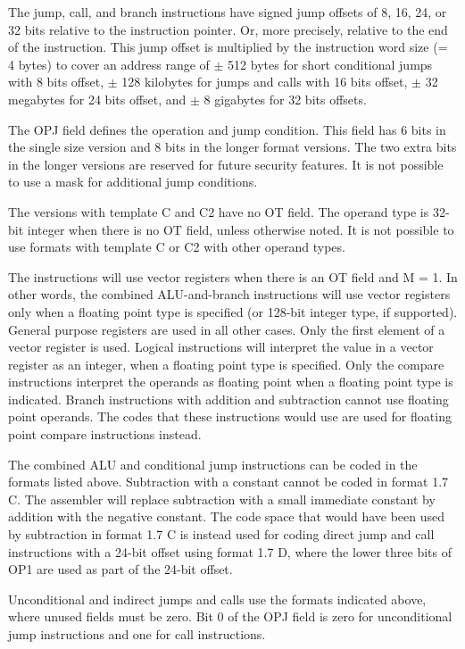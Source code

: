 \documentclass[forwardcom.tex]{subfiles}
\begin{document}
The jump, call, and branch instructions have signed jump offsets of 8, 16, 24, or 32 bits relative to the instruction pointer. Or, more precisely, relative to the end of the instruction. This jump offset is multiplied by the instruction word size (= 4 bytes) to cover an address range of $\pm$ 512 bytes for short conditional jumps with 8 bits offset, $\pm$ 128 kilobytes for jumps and calls with 16 bits offset, $\pm$ 32 megabytes for 24 bits offset, and $\pm$ 8 gigabytes for 32 bits offsets.
\vv

The OPJ field defines the operation and jump condition. This field has 6 bits in the single size version and 8 bits in the longer format versions. The two extra bits in the longer versions are reserved for future security features. It is not possible to use a mask for additional jump conditions.
\vv

The versions with template C and C2 have no OT field. The operand type is 32-bit integer when there is no OT field, unless otherwise noted. It is not possible to use formats with template C or C2 with other operand types. 
\vv

The instructions will use vector registers when there is an OT field and M = 1. In other words, the combined ALU-and-branch instructions will use vector registers only when a floating point type is specified (or 128-bit integer type, if supported). General purpose registers are used in all other cases. Only the first element of a vector register is used. 
Logical instructions will interpret the value in a vector register as an integer, when a floating point type is specified. Only the compare instructions interpret the operands as floating point when a floating point type is indicated. Branch instructions with addition and subtraction cannot use floating point operands. The codes that these instructions would use are used for floating point compare instructions instead.
\vv

The combined ALU and conditional jump instructions can be coded in the formats listed above. Subtraction with a constant cannot be coded in format 1.7 C. The assembler will replace subtraction with a small immediate constant by addition with the negative constant. The code space that would have been used by subtraction in format 1.7 C is instead used for coding direct jump and call instructions with a 24-bit offset using format 1.7 D, where the lower three bits of OP1 are used as part of the 24-bit offset.
\vv

Unconditional and indirect jumps and calls use the formats indicated above, where unused fields must be zero. Bit 0 of the OPJ field is zero for unconditional jump instructions and one for call instructions.
\vv
\end{document}
